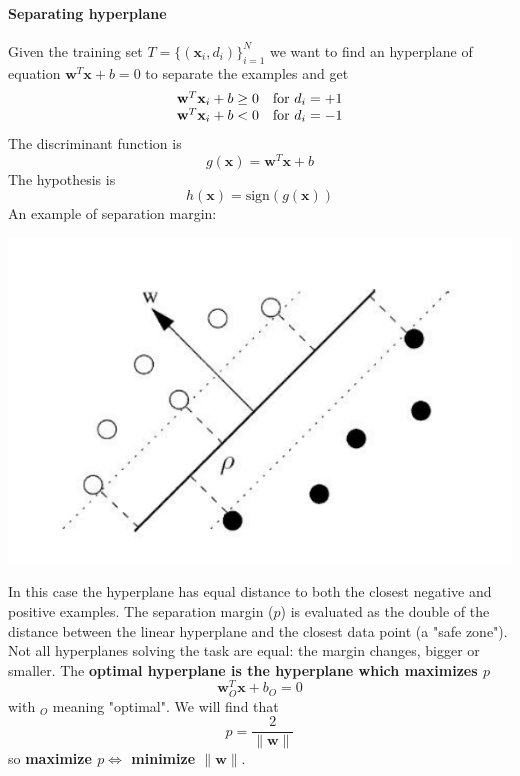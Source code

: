 \documentclass[10pt]{report}
\begin{document}
\paragraph{Separating hyperplane} Given the training set $T = \{(\mathbf{x}_i, d_i)\}_{i=1}^N$ we want to find an hyperplane of equation $\mathbf{w}^T\mathbf{x} + b = 0$ to separate the examples and get
$$\begin{array}{r l}
\mathbf{w}^T\mathbf{x}_i + b \geq 0 & \text{for }d_i=+1\\
\mathbf{w}^T\mathbf{x}_i + b < 0 & \text{for }d_i=-1
\end{array}$$
The discriminant function is 
$$g(\mathbf{x}) = \mathbf{w}^T\mathbf{x} + b$$
The hypothesis is 
$$h(\mathbf{x}) = \text{sign}(g(\mathbf{x}))$$
An example of separation margin:
\begin{center}
	\includegraphics[scale=0.33]{18.png}
\end{center}
In this case the hyperplane has equal distance to both the closest negative and positive examples. The separation margin ($p$) is evaluated as the double of the distance between the linear hyperplane and the closest data point (a "safe zone"). Not all hyperplanes solving the task are equal: the margin changes, bigger or smaller. The \textbf{optimal hyperplane is the hyperplane which maximizes $p$} $$\mathbf{w}_O^T\mathbf{x} + b_O = 0$$ with $_O$ meaning "optimal". We will find that $$p = \frac{2}{\|\mathbf{w}\|}$$ so \textbf{maximize $p\Leftrightarrow$ minimize $\|\mathbf{w}\|$}.
\end{document}
